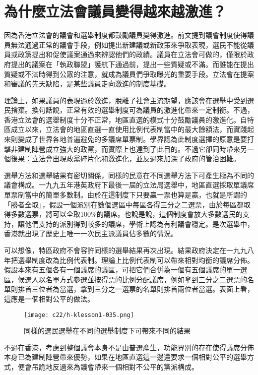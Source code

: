 \section{為什麼立法會議員變得越來越激進？}

因為香港立法會的議會和選舉制度都鼓勵議員變得激進。前文提到議會制度使得議員無法通過正常的議會手段，例如提出新建議或新政策來爭取表現，選民不能從議員或政黨提出和促使議案通過來辨認他們的政績。議員在立法會可做的，僅限於政府提出的議案在「執政聯盟」護航下通過前，提出一些質疑或不滿。而誰能在提出質疑或不滿時得到公眾的注意，就成為議員們爭取曝光的重要手段。立法會在提案和審議的先天缺陷，是某些議員走向激進的制度基礎。

理論上，如果議員的表現過於激進，脫離了社會主流期望，應該會在選舉中受到選民捨棄。換句話說，正常有效的選舉制度可為議員的激進化帶來一定制衡。不過，香港立法會的選舉制度十分不正常，地區直選的模式十分鼓勵議員的激進化。自特區成立以來，立法會的地區直選一直使用比例代表制當中的最大餘額法，而實踐起來則變成了世界各地普遍避免的多議席單票制。學界認為此制度選擇的原意是要打擊非建制陣營成立強大的政黨，而實際上也達到了此目的。不過它卻同時帶來另一個後果：立法會出現政黨碎片化和激進化，並反過來加深了政府的管治困難。

選舉方法和選舉結果有密切關係，同樣的民意在不同選舉方法下可產生極為不同的議會構成。一九九五年港英政府下最後一屆的立法局選舉中，地區直選採取單議席單票制當中的簡單多數制。由於在這制度下只要贏一票也算是贏，也就是所謂的「勝者全取」，假設一個派別在數個選區中每區各得三分之二選票，由於每區都取得多數選票，將可以全取100\%的議席。也說是說，這個制度會放大多數選民的支持，讓他們支持的派別得到較多的議席，學術上認為有利議會穩定。是次選舉中，香港就出現了歷史上唯一一次民主派議員佔多數的情況。

可以想像，特區政府不會容許同樣的選舉結果再次出現。結果政府決定在一九九八年把選舉制度改為比例代表制。理論上比例代表制可以帶來相對均衡的議席分佈。假設本來有五個各有一個議席的議區，可把它們合併為一個有五個議席的單一選區，候選人以名單方式參選並按得票的比例分配議席，例如拿到三分之二選票的名單則排首三位者為當選，拿到三分之一選票的名單則排首兩位者當選。表面上看，這應是一個相對公平的做法。

\begin{figure}[htbp]
    \centering
    \texttt{[image: c22/h-klesson1-035.png]}
    \caption{同樣的選民選舉在不同的選舉制度下可帶來不同的結果} 
\end{figure}

不過在香港，考慮到整個議會本身不是由普選產生，功能界別的存在使得議席分佈本身已為建制陣營帶來優勢，如果在地區直選這一邊還要求一個相對公平的選舉方式，便會吊詭地反過來為議會帶來一個相對不公平的黨派構成。


